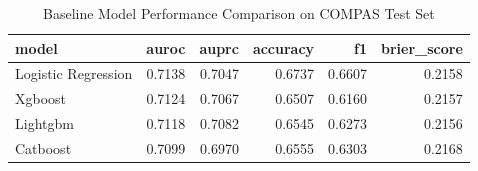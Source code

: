 \begin{table}
\caption{Baseline Model Performance Comparison on COMPAS Test Set}
\label{tab:baseline_comparison}
\begin{tabular}{lrrrrr}
\toprule
model & auroc & auprc & accuracy & f1 & brier_score \\
\midrule
Logistic Regression & 0.7138 & 0.7047 & 0.6737 & 0.6607 & 0.2158 \\
Xgboost & 0.7124 & 0.7067 & 0.6507 & 0.6160 & 0.2157 \\
Lightgbm & 0.7118 & 0.7082 & 0.6545 & 0.6273 & 0.2156 \\
Catboost & 0.7099 & 0.6970 & 0.6555 & 0.6303 & 0.2168 \\
\bottomrule
\end{tabular}
\end{table}
